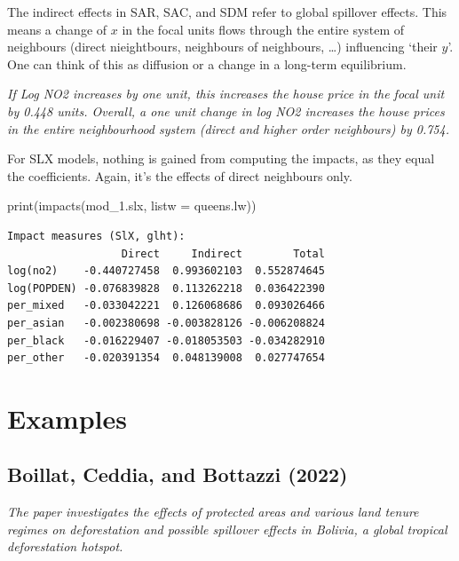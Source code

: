 \documentclass[
  letterpaper,
]{scrbook}
\newenvironment{Shaded}{\begin{snugshade}}{\end{snugshade}}
\newcommand{\AttributeTok}[1]{\textcolor[rgb]{0.40,0.45,0.13}{#1}}
\newcommand{\FunctionTok}[1]{\textcolor[rgb]{0.28,0.35,0.67}{#1}}
\newcommand{\NormalTok}[1]{\textcolor[rgb]{0.00,0.23,0.31}{#1}}
\begin{document}
The indirect effects in SAR, SAC, and SDM refer to global spillover
effects. This means a change of \(x\) in the focal units flows through
the entire system of neighbours (direct nieightbours, neighbours of
neighbours, \ldots) influencing `their \(y\)'. One can think of this as
diffusion or a change in a long-term equilibrium.

\emph{If Log NO2 increases by one unit, this increases the house price
in the focal unit by 0.448 units. Overall, a one unit change in log NO2
increases the house prices in the entire neighbourhood system (direct
and higher order neighbours) by 0.754.}

For SLX models, nothing is gained from computing the impacts, as they
equal the coefficients. Again, it's the effects of direct neighbours
only.

\begin{Shaded}
\begin{Highlighting}[]
\FunctionTok{print}\NormalTok{(}\FunctionTok{impacts}\NormalTok{(mod\_1.slx, }\AttributeTok{listw =}\NormalTok{ queens.lw))}
\end{Highlighting}
\end{Shaded}

\begin{verbatim}
Impact measures (SlX, glht):
                  Direct     Indirect        Total
log(no2)    -0.440727458  0.993602103  0.552874645
log(POPDEN) -0.076839828  0.113262218  0.036422390
per_mixed   -0.033042221  0.126068686  0.093026466
per_asian   -0.002380698 -0.003828126 -0.006208824
per_black   -0.016229407 -0.018053503 -0.034282910
per_other   -0.020391354  0.048139008  0.027747654
\end{verbatim}

\hypertarget{examples}{%
\section{Examples}\label{examples}}

\hypertarget{boillat.2022}{%
\subsection*{Boillat, Ceddia, and Bottazzi (2022)}\label{boillat.2022}}

\emph{The paper investigates the effects of protected areas and various
land tenure regimes on deforestation and possible spillover effects in
Bolivia, a global tropical deforestation hotspot.}
\end{document}
